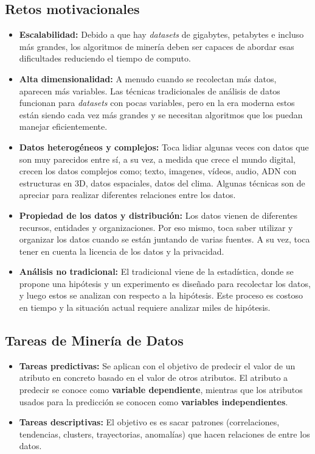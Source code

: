 \documentclass{article}
\begin{document}
\subsection{Retos motivacionales}
\begin{itemize}
  \item \textbf{Escalabilidad:} Debido a que hay \textit{datasets} de gigabytes, petabytes e incluso más grandes, los algoritmos de minería deben ser capaces de abordar esas dificultades reduciendo el tiempo de computo.
  \item \textbf{Alta dimensionalidad:} A menudo cuando se recolectan más datos, aparecen más variables. Las técnicas tradicionales de análisis de datos funcionan para \textit{datasets} con pocas variables, pero en la era moderna estos están siendo cada vez más grandes y se necesitan algoritmos que los puedan manejar eficientemente.
  \item \textbf{Datos heterogéneos y complejos:} Toca lidiar algunas veces con datos que son muy parecidos entre sí, a su vez, a medida que crece el mundo digital, crecen los datos complejos como; texto, imagenes, vídeos, audio, ADN con estructuras en 3D, datos espaciales, datos del clima. Algunas técnicas son de apreciar para realizar diferentes relaciones entre los datos.
  \item \textbf{Propiedad de los datos y distribución:} Los datos vienen de diferentes recursos, entidades y organizaciones. Por eso mismo, toca saber utilizar y organizar los datos cuando se están juntando de varias fuentes. A su vez, toca tener en cuenta la licencia de los datos y la privacidad.
  \item \textbf{Análisis no tradicional:} El tradicional viene de la estadística, donde se propone una hipótesis y un experimento es diseñado para recolectar los datos, y luego estos se analizan con respecto a la hipótesis. Este proceso es costoso en tiempo y la situación actual requiere analizar miles de hipótesis.
\end{itemize}   

\subsection{Tareas de Minería de Datos}

\begin{itemize}
  \item \textbf{Tareas predictivas:} Se aplican con el objetivo de predecir el valor de un atributo en concreto basado en el valor de otros atributos. El atributo a predecir se conoce como \textbf{variable dependiente}, mientras que los atributos usados para la predicción se conocen como \textbf{variables independientes}.
  \item \textbf{Tareas descriptivas:} El objetivo es es sacar patrones (correlaciones, tendencias, clusters, trayectorias, anomalías) que hacen relaciones de entre los datos.
\end{itemize}
\end{document}
